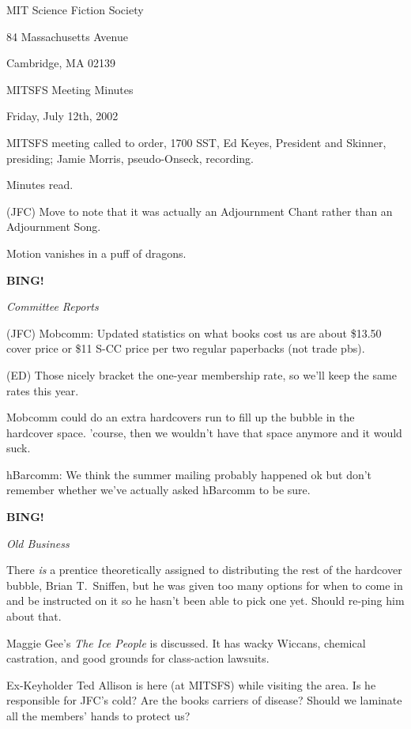 \documentclass[12pt]{article}
\newcommand{\bing}{{\bf BING!} }
\newcommand{\goto}[1]{\bing \vskip 12pt \centerline{{\em{#1}}}}
\begin{document}
\begin{center}

MIT Science Fiction Society 

84 Massachusetts Avenue

Cambridge, MA 02139

\vspace{12pt}

MITSFS Meeting Minutes 

Friday, July 12th, 2002

\end{center}
 
\vspace{18pt}

\setlength{\parskip}{6pt}

\noindent
MITSFS meeting called to order, 1700 SST, Ed Keyes, President and
Skinner, presiding; Jamie Morris, pseudo-Onseck, recording.

Minutes read.

(JFC) Move to note that it was actually an Adjournment Chant rather than
an Adjournment Song.

Motion vanishes in a puff of dragons.

\goto{Committee Reports}

(JFC) Mobcomm: Updated statistics on what books cost us are about \$13.50
cover price or \$11 S-CC price per two regular paperbacks (not trade pbs).

(ED) Those nicely bracket the one-year membership rate, so we'll keep
the same rates this year.

Mobcomm could do an extra hardcovers run to fill up the bubble in the
hardcover space.  'course, then we wouldn't have that space anymore and
it would suck.

hBarcomm: We think the summer mailing probably happened ok but don't
remember whether we've actually asked hBarcomm to be sure.

\goto{Old Business}

There \emph{is} a prentice theoretically assigned to distributing the
rest of the hardcover bubble, Brian T.~Sniffen, but he was given too many
options for when to come in and be instructed on it so he hasn't been able
to pick one yet.  Should re-ping him about that.

Maggie Gee's \emph{The Ice People} is discussed.  It has wacky Wiccans,
chemical castration, and good grounds for class-action lawsuits.

Ex-Keyholder Ted Allison is here (at MITSFS) while visiting the area.
Is he responsible for JFC's cold?  Are the books carriers of disease?
Should we laminate all the members' hands to protect us?
\end{document}
